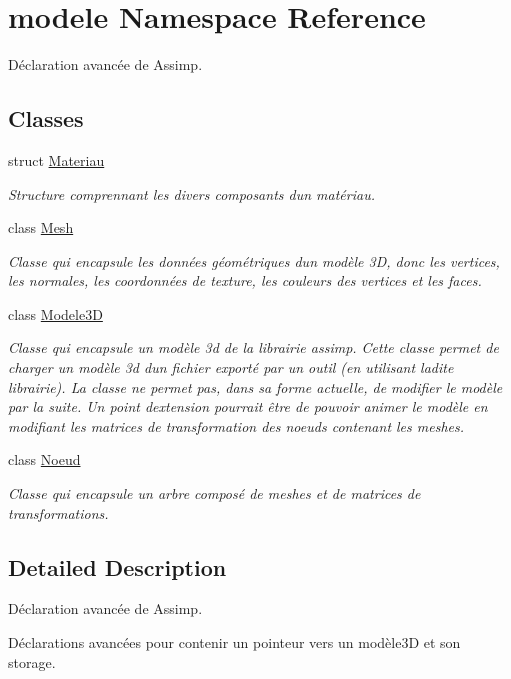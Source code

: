 \hypertarget{namespacemodele}{}\section{modele Namespace Reference}
\label{namespacemodele}


Déclaration avancée de Assimp.  


\subsection*{Classes}
\begin{DoxyCompactItemize}
\item 
struct \hyperlink{structmodele_1_1_materiau}{Materiau}
\begin{DoxyCompactList}\small\item\em Structure comprennant les divers composants d\textquotesingle{}un matériau. \end{DoxyCompactList}\item 
class \hyperlink{classmodele_1_1_mesh}{Mesh}
\begin{DoxyCompactList}\small\item\em Classe qui encapsule les données géométriques d\textquotesingle{}un modèle 3\+D, donc les vertices, les normales, les coordonnées de texture, les couleurs des vertices et les faces. \end{DoxyCompactList}\item 
class \hyperlink{classmodele_1_1_modele3_d}{Modele3\+D}
\begin{DoxyCompactList}\small\item\em Classe qui encapsule un modèle 3d de la librairie \textquotesingle{}assimp\textquotesingle{}. Cette classe permet de charger un modèle 3d d\textquotesingle{}un fichier exporté par un outil (en utilisant ladite librairie). La classe ne permet pas, dans sa forme actuelle, de modifier le modèle par la suite. Un point d\textquotesingle{}extension pourrait être de pouvoir animer le modèle en modifiant les matrices de transformation des noeuds contenant les meshes. \end{DoxyCompactList}\item 
class \hyperlink{classmodele_1_1_noeud}{Noeud}
\begin{DoxyCompactList}\small\item\em Classe qui encapsule un arbre composé de meshes et de matrices de transformations. \end{DoxyCompactList}\end{DoxyCompactItemize}


\subsection{Detailed Description}
Déclaration avancée de Assimp. 

Déclarations avancées pour contenir un pointeur vers un modèle3\+D et son storage. 